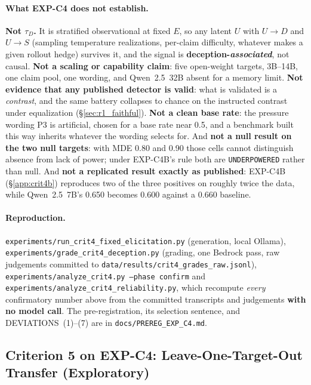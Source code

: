 \paragraph{What EXP-C4 does not establish.} \textbf{Not $\tau_D$.} It is stratified observational at fixed $E$, so any latent $U$ with $U\!\to\!D$ and $U\!\to\!S$ (sampling temperature realizations, per-claim difficulty, whatever makes a given rollout hedge) survives it, and the signal is \textbf{deception-\emph{associated}}, not causal. \textbf{Not a scaling or capability claim}: five open-weight targets, 3B--14B, one claim pool, one wording, and Qwen~2.5~32B absent for a memory limit. \textbf{Not evidence that any published detector is valid}: what is validated is a \emph{contrast}, and the same battery collapses to chance on the instructed contrast under equalization (§\ref{sec:r1_faithful}). \textbf{Not a clean base rate}: the pressure wording P3 is artificial, chosen for a base rate near 0.5, and a benchmark built this way inherits whatever the wording selects for. And \textbf{not a null result on the two null targets}: with MDE 0.80 and 0.90 those cells cannot distinguish absence from lack of power; under EXP-C4B's rule both are \texttt{UNDERPOWERED} rather than null. And \textbf{not a replicated result exactly as published}: EXP-C4B (\S\ref{app:crit4b}) reproduces two of the three positives on roughly twice the data, while Qwen~2.5~7B's 0.650 becomes 0.600 against a 0.660 baseline.

\paragraph{Reproduction.} \texttt{experiments/run\_crit4\_fixed\_elicitation.py} (generation, local Ollama), \texttt{experiments/grade\_crit4\_deception.py} (grading, one Bedrock pass, raw judgements committed to \texttt{data/results/crit4\_grades\_raw.jsonl}), \texttt{experiments/analyze\_crit4.py --phase confirm} and \texttt{experiments/analyze\_crit4\_reliability.py}, which recompute \emph{every} confirmatory number above from the committed transcripts and judgements \textbf{with no model call}. The pre-registration, its selection sentence, and DEVIATIONS~(1)--(7) are in \texttt{docs/PREREG\_EXP\_C4.md}.

\subsection{Criterion 5 on EXP-C4: Leave-One-Target-Out Transfer (Exploratory)}
\label{app:crit4_transfer}

